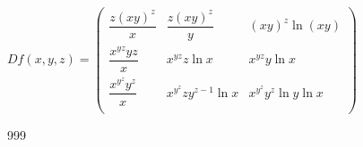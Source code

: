 \documentclass[a4paper]{article}
\begin{document}
$Df(x,y,z)= \left(\begin{array}{ccc}
\dfrac{z(xy)^z}{x} & \dfrac{z(xy)^z}{y} & (xy)^z \ln (xy)\\
\dfrac{x^{yz}yz}{x} & x^{yz}z\ln x & x^{yz}y\ln x\\
\dfrac{x^{y^z}y^z}{x} & x^{y^z} zy^{z-1} \ln x & x^{y^z}y^z \ln y \ln x\\
\end{array} \right)$\\




















\begin{thebibliography}{999}
\end{thebibliography}
\end{document}
